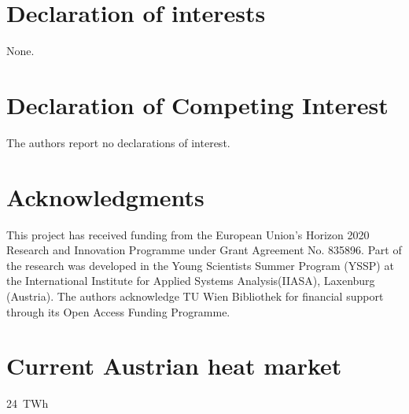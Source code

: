 \documentclass[review]{elsarticle}
\begin{document}





\section*{Declaration of interests}
None.
\section*{Declaration of Competing Interest}
The authors report no declarations of interest.
\section*{Acknowledgments}
This project has received funding from the European Union's Horizon 2020 Research and Innovation Programme under Grant Agreement No. 835896. Part of the research was developed in the Young Scientists Summer Program (YSSP) at the International Institute for Applied Systems Analysis(IIASA), Laxenburg (Austria). The authors acknowledge TU Wien Bibliothek for financial support through its Open Access Funding Programme.


\appendix
\setcounter{table}{0}
\setcounter{figure}{0}

\section{Current Austrian heat market}\label{appendixC}
 \SI{24}{TWh}   
\end{document}
